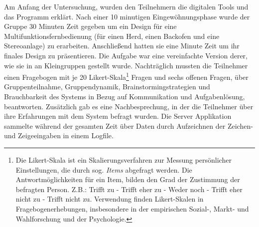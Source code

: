 \medskip Am Anfang der Untersuchung, wurden den Teilnehmern die digitalen Tools und das Programm erklärt. Nach einer 10 minutigen Eingewöhnungsphase wurde der Gruppe 30 Minuten Zeit gegeben um ein Design für eine Multifunktionsfernbedienung (für einen Herd, einen Backofen und eine Stereoanlage) zu erarbeiten. Anschließend hatten sie eine Minute Zeit um ihr finales Design zu präsentieren. Die Aufgabe war eine vereinfachte Version derer, wie sie in \citep{Tang1991143} an Kleingruppen gestellt wurde. Nachträglich mussten die Teilnehmer einen Fragebogen mit je 20 Likert-Skala\footnote{Die Likert-Skala ist ein Skalierungsverfahren zur Messung persönlicher Einstellungen, die durch sog. \emph{Items} abgefragt werden. Die Antwortmöglichkeiten für ein Item, bilden den Grad der Zustimmung der befragten Person. Z.B.: Trifft zu - Trifft eher zu - Weder noch - Trifft eher nicht zu - Trifft nicht zu. Verwendung finden Likert-Skalen in Fragebogenerhebungen, insbesondere in der empirischen Sozial-, Markt- und Wahlforschung und der Psychologie.} Fragen und sechs offenen Fragen, über Gruppenteilnahme, Gruppendynamik, Brainstormingstrategien und Brauchbarkeit des Systems in Bezug auf Kommunikation und Aufgabenlösung, beantworten. Zusätzlich gab es eine Nachbesprechung, in der die Teilnehmer über ihre Erfahrungen mit dem System befragt wurden. Die Server Applikation sammelte während der gesamten Zeit über Daten durch Aufzeichnen der Zeichen- und Zeigeeingaben in einem Logfile.

